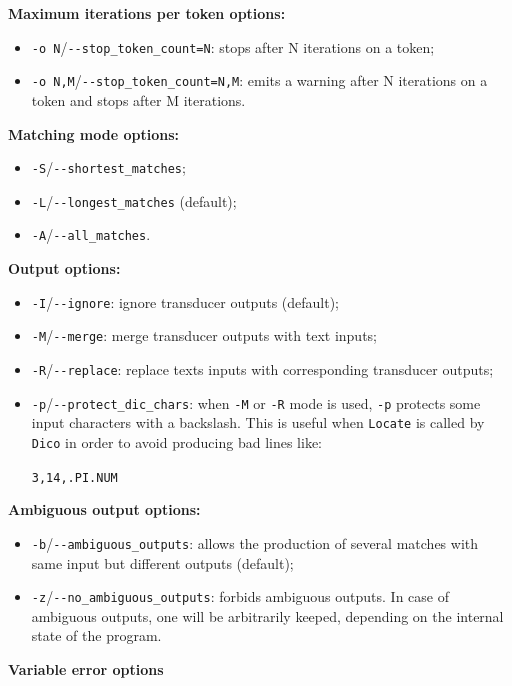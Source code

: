 \bigskip
\noindent \textbf{Maximum iterations per token options:}
\begin{itemize}
  \item \verb+-o N+/\verb+--stop_token_count=N+: stops after N iterations on a token;
  \item \verb+-o N,M+/\verb+--stop_token_count=N,M+: emits a warning after N iterations on a token and stops after M iterations.
\end{itemize}

\bigskip
\noindent \textbf{Matching mode options:}
\begin{itemize}
  \item \verb+-S+/\verb+--shortest_matches+;
  \item \verb+-L+/\verb+--longest_matches+ (default);
  \item \verb+-A+/\verb+--all_matches+.
\end{itemize}

\bigskip
\noindent \textbf{Output options:}
\begin{itemize}
  \item \verb+-I+/\verb+--ignore+: ignore transducer outputs (default);
  \item \verb+-M+/\verb+--merge+: merge transducer outputs with text inputs;
  \item \verb+-R+/\verb+--replace+: replace texts inputs with corresponding
  transducer outputs;
  \item \verb+-p+/\verb+--protect_dic_chars+: when \verb+-M+ or \verb+-R+ mode is
  used, \verb+-p+ protects some input characters with a backslash. This is useful
  when \verb+Locate+ is called by \verb+Dico+ in order to avoid producing bad
  lines like:
  
  \verb+3,14,.PI.NUM+
\end{itemize}

\bigskip
\noindent \textbf{Ambiguous output options:}
\begin{itemize}
  \item \verb+-b+/\verb+--ambiguous_outputs+: allows the production of several 
  matches with same input but different outputs (default);
  \item \verb+-z+/\verb+--no_ambiguous_outputs+: forbids ambiguous outputs. In
  case of ambiguous outputs, one will be arbitrarily keeped, depending on the
  internal state of the program.
\end{itemize}

\bigskip
\noindent \textbf{Variable error options}

